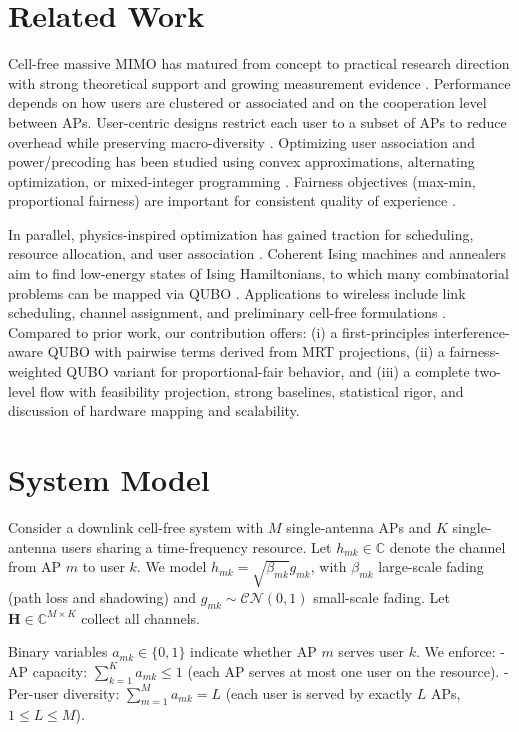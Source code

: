 {\section{Related Work}
Cell-free massive MIMO has matured from concept to practical research direction with strong theoretical support and growing measurement evidence \cite{ngo2017cell,demir2021foundations,bjornson2019massive}. Performance depends on how users are clustered or associated and on the cooperation level between APs. User-centric designs restrict each user to a subset of APs to reduce overhead while preserving macro-diversity \cite{buzzi2019user,chen2020structured}. Optimizing user association and power/precoding has been studied using convex approximations, alternating optimization, or mixed-integer programming \cite{nayebi2017precoding,bjornson2019making}. Fairness objectives (max-min, proportional fairness) are important for consistent quality of experience \cite{bashar2021max}.

In parallel, physics-inspired optimization has gained traction for scheduling, resource allocation, and user association \cite{kasi2021resource,grassl2022ising}. Coherent Ising machines and annealers aim to find low-energy states of Ising Hamiltonians, to which many combinatorial problems can be mapped via QUBO \cite{lucas2014ising,mcmahon2016fully,inagaki2016coherent,glover2018tutorial}. Applications to wireless include link scheduling, channel assignment, and preliminary cell-free formulations \cite{zhao2022joint}. Compared to prior work, our contribution offers: (i) a first-principles interference-aware QUBO with pairwise terms derived from MRT projections, (ii) a fairness-weighted QUBO variant for proportional-fair behavior, and (iii) a complete two-level flow with feasibility projection, strong baselines, statistical rigor, and discussion of hardware mapping and scalability.

\section{System Model}
Consider a downlink cell-free system with $M$ single-antenna APs and $K$ single-antenna users sharing a time-frequency resource. Let $h_{mk}\in\mathbb{C}$ denote the channel from AP $m$ to user $k$. We model $h_{mk}=\sqrt{\beta_{mk}} g_{mk}$, with $\beta_{mk}$ large-scale fading (path loss and shadowing) and $g_{mk}\sim \mathcal{CN}(0,1)$ small-scale fading. Let $\mathbf{H}\in \mathbb{C}^{M\times K}$ collect all channels.

Binary variables $a_{mk}\in\{0,1\}$ indicate whether AP $m$ serves user $k$. We enforce:
- AP capacity: $\sum_{k=1}^K a_{mk}\le 1$ (each AP serves at most one user on the resource).
- Per-user diversity: $\sum_{m=1}^M a_{mk}=L$ (each user is served by exactly $L$ APs, $1\le L\le M$).

}
